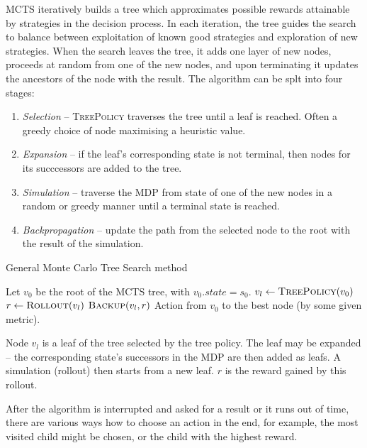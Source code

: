 MCTS iteratively builds a tree which approximates possible rewards
attainable by strategies in the decision process. In each iteration, the
tree guides the search to balance between exploitation of known good
strategies and exploration of new strategies. When the search leaves the
tree, it adds one layer of new nodes, proceeds at random from one of the
new nodes, and upon terminating it updates the ancestors of the node
with the result. The algorithm can be splt into four stages:

\begin{enumerate}
    \item {\em Selection} -- \textsc{TreePolicy} traverses the tree
        until a leaf is reached. Often a greedy choice of node
        maximising a heuristic value.
    \item {\em Expansion} -- if the leaf's corresponding state is not
        terminal, then nodes for its succcessors are added to the tree.
    \item {\em Simulation} -- traverse the MDP from state of one of the new
        nodes in a random or greedy manner until a terminal state is reached.
    \item {\em Backpropagation} -- update the path from the selected
        node to the root with the result of the simulation.
\end{enumerate}


\begin{algorithm}
\caption{General Monte Carlo Tree Search method}
\label{mcts}
\begin{algorithmic}[1]
    \State Let $v_0$ be the root of the MCTS tree, with $v_0.state = s_0$.
        \State $v_l \gets \Call{TreePolicy}{v_0}$
        \State $r \gets \Call{Rollout}{v_l}$
        \State $\Call{Backup}{v_l, r}$
    \EndWhile
    \State \Return Action from $v_0$ to the best node (by some
    given metric).
\EndFunction
\end{algorithmic}
\end{algorithm}

Node $v_l$ is a leaf of the tree selected by the tree policy.
The leaf may be expanded -- the corresponding state's successors in the
MDP are then added as leafs.
A simulation (rollout) then starts from a new leaf.
$r$ is the reward gained by this rollout.

After the algorithm is interrupted and asked for a result or it runs out
of time, there are various ways how to
choose an action in the end, for example, the most visited child might
be chosen, or the child with the highest reward.


